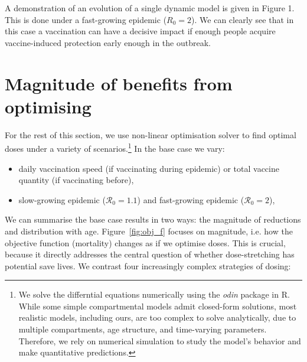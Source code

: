 \documentclass[12pt]{article}
\begin{document}
A demonstration of an evolution of a single dynamic model is given in Figure 1. This is done under a fast-growing epidemic ($R_0 = 2$). We can clearly see that in this case a vaccination can have a decisive impact if enough people acquire vaccine-induced protection early enough in the outbreak.


\section{Magnitude of benefits from optimising}

For the rest of this section, we use non-linear optimisation solver to find optimal doses under a variety of scenarios.\footnote{We solve the differntial equations numerically using the \textit{odin} package in R. While some simple compartmental models admit closed-form solutions, most realistic models, including ours, are too complex to solve analytically, due to multiple compartments, age structure, and time-varying parameters. Therefore, we rely on numerical simulation to study the model's behavior and make quantitative predictions.} In the base case we vary:

\begin{itemize}
\item daily vaccination speed (if vaccinating during epidemic) or total vaccine quantity (if vaccinating before),
\item slow-growing epidemic ($\mathcal{R}_0 = 1.1$) and fast-growing epidemic ($\mathcal{R}_0 = 2$),
\end{itemize}

We can summarise the base case results in two ways: the magnitude of reductions and distribution with age. Figure~\ref{fig:obj_f} focuses on magnitude, i.e. how the objective function (mortality) changes as if we optimise doses. This is crucial, because it directly addresses the central question of whether dose-stretching has potential save lives. We contrast four increasingly complex strategies of dosing:

\end{document}
